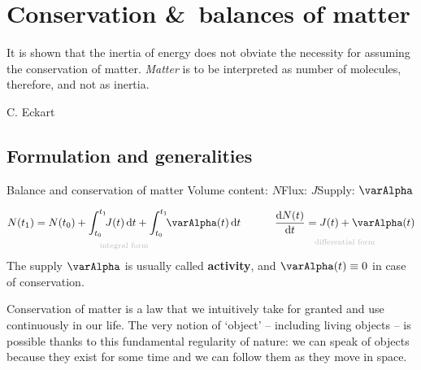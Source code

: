 \documentclass[a4paper,12pt,%
onecolumn,oneside,%
british%
]{memoir}
\newcommand*{\amp}{\&}
\newcommand*{\di}{\mathrm{d}}%
\renewcommand*{\|}[1][]{\nonscript\:#1\vert\nonscript\:\mathopen{}}
\newcommand*{\yti}{t_{0}}
\newcommand*{\ytf}{t_{1}}
\newcommand*{\yN}{N}
\newcommand*{\yJ}{J}
\newcommand*{\ya}{\varAlpha}
\begin{document}
\printpagenotes*
\clearpage
\chapter{Conservation \amp\ balances of matter}
\label{cha:cons_matter}

\epigraph{It is shown that the inertia of energy does not obviate the necessity for assuming the conservation of matter. \emph{Matter} is to be interpreted as number of molecules, therefore, and not as inertia.}{C. Eckart \cites*{eckart1940c}}

\section{Formulation and generalities}
\label{sec:cons_matter_formulation}

\begin{definition}{Balance and conservation of matter}
  Volume content: $\yN$\qquad Flux: $\yJ$\qquad Supply: $\ya$

  \begin{equation}
    \label{eq:cons_matter}
    \underbracket[0pt]{\yN(\ytf) =
      \yN(\yti) +
      \int_{\yti}^{\ytf}\!\!\yJ(t)\,\di t  +
      \int_{\yti}^{\ytf}\!\!\ya(t)\,\di t}_{\mathclap{\text{\color{grey}integral form}}}
      \qquad\quad
      \underbracket[0pt]{\frac{\di\yN(t)}{\di t} = \yJ(t) +
        \ya(t)}_{\mathclap{\text{\color{grey}differential form}}}
  \end{equation}
  The supply $\ya$ is usually called \textbf{activity}, and $\ya(t)\equiv 0$ in case of conservation.
\end{definition}

Conservation of matter is a law that we intuitively take for granted and use continuously in our life. The very notion of \enquote*{object} -- including living objects -- is possible thanks to this fundamental regularity of nature: we can speak of objects because they exist for some time and we can follow them as they move in space. %
\end{document}

